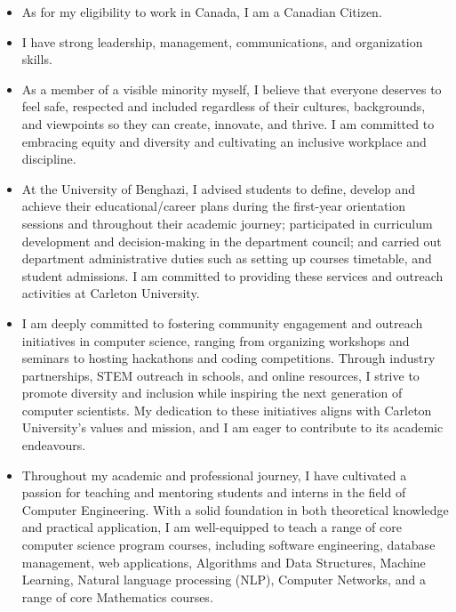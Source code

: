 \documentclass[letterpaper,11pt,oneside]{article}
\begin{document}
\begin{itemize}
    \item As for my eligibility to work in Canada, I am a Canadian Citizen.
    
      \item I have strong leadership, management, communications, and organization skills.
      
    \item As a member of a visible minority myself, I believe that everyone deserves to feel safe, respected and included regardless of their cultures, backgrounds, and viewpoints so they can create, innovate, and thrive. I am committed to embracing equity and diversity and cultivating an inclusive workplace and discipline.
    
  \item At the University of Benghazi, I advised students to define, develop and achieve their educational/career plans during the first-year orientation sessions and throughout their academic journey; participated in curriculum development and decision-making in the department council; and carried out department administrative duties such as setting up courses timetable, and student admissions. I am committed to providing these services and outreach activities at Carleton University.
  
  \item I am deeply committed to fostering community engagement and outreach initiatives in computer science, ranging from organizing workshops and seminars to hosting hackathons and coding competitions. Through industry partnerships, STEM outreach in schools, and online resources, I strive to promote diversity and inclusion while inspiring the next generation of computer scientists. My dedication to these initiatives aligns with  Carleton University's values and mission, and I am eager to contribute to its academic endeavours.
  
 \item Throughout my academic and professional journey, I have cultivated a passion for teaching and mentoring students and interns in the field of Computer Engineering. With a solid foundation in both theoretical knowledge and practical application, I am well-equipped to teach a range of core computer science program courses, including software engineering, database management, web applications, Algorithms and Data Structures, Machine Learning, Natural language processing (NLP), Computer Networks, and a range of core Mathematics courses.
\end{itemize}
\end{document}
